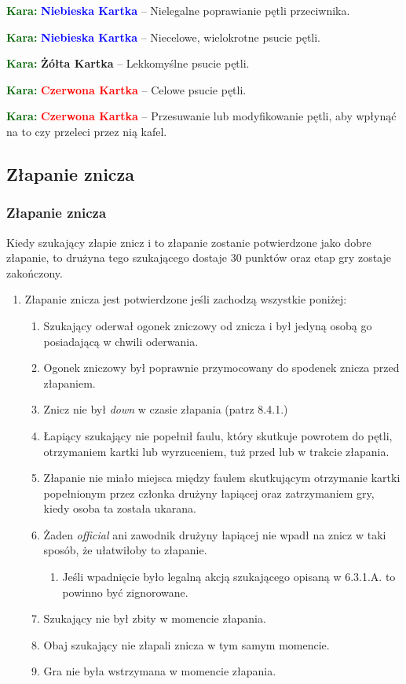 \documentclass[11pt,a4paper]{article}
\newcommand\redcard[1]{\bgroup\textcolor{darkgreen}{\textbf{Kara: }}\bgroup\textcolor{red}{\textbf{Czerwona Kartka}} -- #1}
\newcommand\yellowcard[1]{\bgroup\textcolor{darkgreen}{\textbf{Kara: }}\bgroup\textcolor{darkyellow}{\textbf{Żółta Kartka}} -- #1}
\newcommand\bluecard[1]{\bgroup\textcolor{darkgreen}{\textbf{Kara: }}\bgroup\textcolor{blue}{\textbf{Niebieska Kartka}} -- #1}
\begin{document}
\bluecard{Nielegalne poprawianie pętli przeciwnika.}

\bluecard{Niecelowe, wielokrotne psucie pętli.}

\yellowcard{Lekkomyślne psucie pętli.}

\redcard{Celowe psucie pętli.}

\redcard{Przesuwanie lub modyfikowanie pętli, aby wpłynąć na to czy przeleci przez nią kafel.}

\subsection{Złapanie znicza}

\subsubsection{Złapanie znicza}
Kiedy szukający złapie znicz i to złapanie zostanie potwierdzone jako dobre złapanie, to drużyna tego szukającego dostaje 30 punktów oraz etap gry zostaje zakończony.
\begin{enumerate}
  \item Złapanie znicza jest potwierdzone jeśli zachodzą wszystkie poniżej:
  \begin{enumerate}
    \item Szukający oderwał ogonek zniczowy od znicza i był jedyną osobą go posiadającą w chwili oderwania.
    \item Ogonek zniczowy był poprawnie przymocowany do spodenek znicza przed złapaniem.
    \item Znicz nie był \emph{down} w czasie złapania (patrz 8.4.1.) %
    \item Łapiący szukający nie popełnił faulu, który skutkuje powrotem do pętli, otrzymaniem kartki lub wyrzuceniem, tuż przed lub w trakcie złapania.
    \item Złapanie nie miało miejsca między faulem skutkującym otrzymanie kartki popełnionym przez członka drużyny łapiącej oraz zatrzymaniem gry, kiedy osoba ta została ukarana.
    \item Żaden \emph{official} ani zawodnik drużyny łapiącej nie wpadł na znicz w taki sposób, że ułatwiłoby to złapanie.
    \begin{enumerate}
      \item Jeśli wpadnięcie było legalną akcją szukającego opisaną w 6.3.1.A. to powinno być zignorowane. %
    \end{enumerate}
    \item Szukający nie był zbity w momencie złapania.
    \item Obaj szukający nie złapali znicza w tym samym momencie.
    \item Gra nie była wstrzymana w momencie złapania.
  \end{enumerate}
\end{enumerate}
\end{document}
